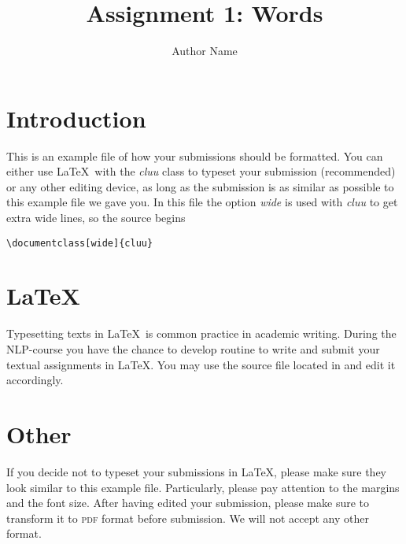 \documentclass[wide]{cluu}
\begin{document}
\author{Author Name}
\title{Assignment 1: Words}
\maketitle

\section{Introduction}

This is an example file of how your submissions should be formatted.
You can either use \LaTeX\ with the \emph{cluu} class to typeset your
submission (recommended) or any other editing device, as long as the
submission is as similar as possible to this example file we gave you.
In this file the option \emph{wide} is used with \emph{cluu} to get
extra wide lines, so the source begins
\begin{verbatim}
\documentclass[wide]{cluu}
\end{verbatim}

\section{\LaTeX}

Typesetting texts in \LaTeX\ is common practice in academic writing.
During the NLP-course you have the chance to develop routine to write
and submit your textual assignments in \LaTeX. You may use the source
file  located in
 and edit it accordingly.

\section{Other}

If you decide not to typeset your submissions in \LaTeX, please make
sure they look similar to this example file. Particularly, please pay
attention to the margins and the font size. After having edited your
submission, please make sure to transform it to \textsc{pdf} format before
submission. We will not accept any other format.
\end{document}
